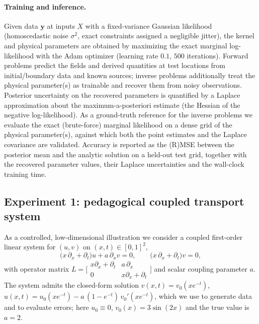 \paragraph{Training and inference.}
Given data $\bm{y}$ at inputs $X$ with a fixed-variance Gaussian
likelihood (homoscedastic noise $\sigma^2$, exact constraints assigned a
negligible jitter), the kernel and physical parameters are obtained by
maximizing the exact marginal log-likelihood with the Adam optimizer
(learning rate $0.1$, $500$ iterations).  Forward problems predict the
fields and derived quantities at test locations from initial/boundary
data and known sources; inverse problems additionally treat the
physical parameter(s) as trainable and recover them from noisy
observations.  Posterior uncertainty on the recovered parameters is
quantified by a Laplace approximation about the maximum-a-posteriori
estimate (the Hessian of the negative log-likelihood).  As a
ground-truth reference for the inverse problems we evaluate the exact
(brute-force) marginal likelihood on a dense grid of the physical
parameter(s), against which both the point estimates and the Laplace
covariance are validated.  Accuracy is reported as the (R)MSE between
the posterior mean and the analytic solution on a held-out test grid,
together with the recovered parameter values, their Laplace
uncertainties and the wall-clock training time.

\subsection{Experiment 1: pedagogical coupled transport system}
\label{sec:ex1}

As a controlled, low-dimensional illustration we consider a coupled
first-order linear system for $(u,v)$ on $(x,t)\in[0,1]^2$,
\begin{equation}
  \bigl(x\,\partial_x+\partial_t\bigr)u + a\,\partial_x v = 0,
  \qquad
  \bigl(x\,\partial_x+\partial_t\bigr)v = 0,
  \label{eq:ex1-pde}
\end{equation}
with operator matrix
$L=\bigl[\begin{smallmatrix} x\partial_x+\partial_t & a\,\partial_x\\
0 & x\partial_x+\partial_t\end{smallmatrix}\bigr]$ and scalar coupling
parameter $a$.  The system admits the closed-form solution
$v(x,t)=v_0(x e^{-t})$,
$u(x,t)=u_0(x e^{-t})-a\,(1-e^{-t})\,v_0'(x e^{-t})$,
which we use to generate data and to evaluate errors; here
$u_0\equiv0$, $v_0(x)=3\sin(2x)$ and the true value is $a=2$.

